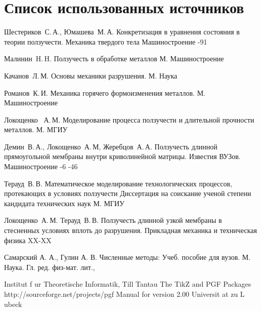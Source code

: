 \chapter*{Список использованных источников}
\renewcommand{\bibname}{Список источников}
\begin{thebibliography}{2013}
\label{shest}
\by Шестериков~С.\,А., Юмашева~М.\,А.
\paper Конкретизация в уравнения состояния в теории ползучести.
\jour Механика твердого тела
\publ Машиностроение
-91


\label{malinin}
\by Малинин~H.\,H.
\book Ползучесть в обработке металлов
\publaddr М.
\publ Машиностроение

\label{kachanov}
\by Качанов~Л.\,М.
\book Основы механики разрушения.
\publaddr М.
\publ Наука

\label{romanov}
\by Романов~К.\,И.
\book Механика горячего формоизменения металлов.
\publaddr М.
\publ Машиностроение


\label{lokoschenko}
\by Локощенко	~А.\,М.
\book Моделирование процесса ползучести и длительной прочности металлов.
\publaddr М.
\publ МГИУ

\label{jerebcov}
	\by Демин~В.\,А., Локощенко~А.\,М, Жеребцов~А.\,А. 
	\paper Ползучесть длинной прямоугольной мембраны внутри криволинейной матрицы. 
	\jour Известия ВУЗов. Машиностроение
	-6
	-46

	
\label{teraud_dis}
	\by Терауд~В.\,В.
	\book Математическое моделирование технологических процессов, протекающих в условиях ползучести
	\publ Диссертация на соискание ученой степени кандидата технических наук
	\publaddr М. МГИУ

\label{teraud}
	\by Локощенко~А.\,М. Терауд~В.\,В. 
	\paper Ползучесть длинной узкой мембраны в стесненных условиях вплоть до разрушения.
	\jour Прикладная механика и техническая физика	
	\pages XX-XX

  \label{samarskiy} 
\by Самарский А. А., Гулин А. В. 
\book Численные методы: Учеб. пособие для вузов.
\publaddr М. Наука. Гл. ред. физ-мат. лит.,

\label{tikz-manual}
 \by Institut f ur Theoretische Informatik, Till Tantau
 \book The TikZ and PGF Packages http://sourceforge.net/projects/pgf Manual for version 2.00
 \publ Universit at zu L ubeck


\end{thebibliography}
